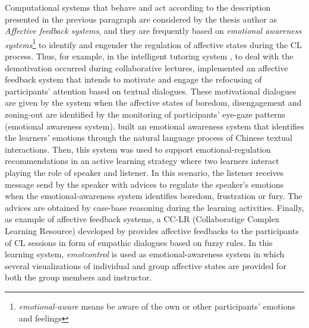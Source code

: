 Computational systems that behave and act according to the description presented in the previous paragraph are considered by the thesis author as \emph{Affective feedback systems}, and they are frequently based on \emph{emotional awareness systems}\footnote{\emph{emotional-aware} means be aware of the own or other participants' emotions and feelings} to identify and engender the regulation of affective states during the CL process.
Thus, for example, in the intelligent tutoring system  \cite{OlneyDMelloPersonCadeHaysWilliamsLehmanGraesser2012}, to deal with the demotivation occurred during collaborative lectures,  implemented an affective feedback system that intends to motivate and engage the refocusing of participants' attention based on textual dialogues.
These motivational dialogues are given by the system  when the affective states of boredom, disengagement and zoning-out are identified by the monitoring of participants' eye-gaze patterns (emotional awareness system).
 built an emotional awareness system that identifies the learners' emotions through the natural language process of Chinese textual interactions.
Then, this system was used to support emotional-regulation recommendations in an active learning strategy where two learners interact playing the role of speaker and listener.
In this scenario, the listener receives message send by the speaker with advices to regulate the speaker's emotions when the emotional-awareness system identifies boredom, frustration or fury.
The advices are obtained by case-base reasoning during the learning activities.
Finally, as example of affective feedback systems, a CC-LR (Collaboratige Complex Learning Resource) developed by  provides affective feedbacks to the participants of CL sessions in form of empathic dialogues based on fuzzy rules.
In this learning system, \emph{emotcontrol} \cite{FeidakisDaradoumisCaballeConesa2014,FeidakisDaradoumisCaballeConesaGanan2013} is used as emotional-awareness system in which several visualizations of individual and group affective states are provided for both the group members and instructor.

